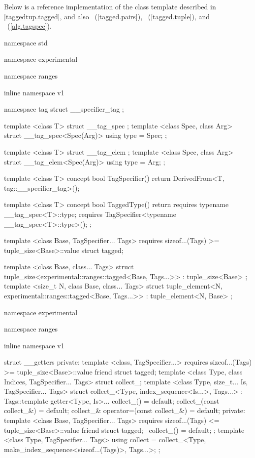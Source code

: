 
\pnum Below is a reference implementation of the  class template described in
\ref{taggedtup.tagged}, and also ~(\ref{tagged.pairs}),
~(\ref{tagged.tuple}), and ~(\ref{alg.tagspec}).

\begin{codeblock}
namespace std { namespace experimental { namespace ranges { inline namespace v1 {
  namespace tag { struct __specifier_tag { }; }

  template <class T>
  struct __tag_spec { };
  template <class Spec, class Arg>
  struct __tag_spec<Spec(Arg)> { using type = Spec; };

  template <class T>
  struct __tag_elem { };
  template <class Spec, class Arg>
  struct __tag_elem<Spec(Arg)> { using type = Arg; };

  template <class T>
  concept bool TagSpecifier() {
    return DerivedFrom<T, tag::__specifier_tag>();
  }

  template <class T>
  concept bool TaggedType() {
    return requires {
      typename __tag_spec<T>::type;
      requires TagSpecifier<typename __tag_spec<T>::type>();
    };
  }

  template <class Base, TagSpecifier... Tags>
    requires sizeof...(Tags) >= tuple_size<Base>::value
  struct tagged;
  }}}

  template <class Base, class... Tags>
  struct tuple_size<experimental::ranges::tagged<Base, Tags...>>
    : tuple_size<Base> { };
  template <size_t N, class Base, class... Tags>
  struct tuple_element<N, experimental::ranges::tagged<Base, Tags...>>
    : tuple_element<N, Base> { };

  namespace experimental { namespace ranges { inline namespace v1 {

  struct __getters {
  private:
    template <class, TagSpecifier...>
      requires sizeof...(Tags) >= tuple_size<Base>::value
    friend struct tagged;
    template <class Type, class Indices, TagSpecifier... Tags>
    struct collect_;
    template <class Type, size_t... Is, TagSpecifier... Tags>
    struct collect_<Type, index_sequence<Is...>, Tags...>
      : Tags::template getter<Type, Is>... {
      collect_() = default;
      collect_(const collect_&) = default;
      collect_& operator=(const collect_&) = default;
    private:
      template <class Base, TagSpecifier... Tags>
        requires sizeof...(Tags) <= tuple_size<Base>::value
      friend struct tagged;
      ~collect_() = default;
    };
    template <class Type, TagSpecifier... Tags>
    using collect = collect_<Type, make_index_sequence<sizeof...(Tags)>, Tags...>;
  };

}}}}
\end{codeblock}
